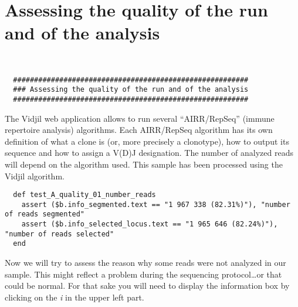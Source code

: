 
\section{Assessing the quality of the run and of the analysis}
\begin{verbatim}


  ########################################################
  ### Assessing the quality of the run and of the analysis
  ########################################################

\end{verbatim}

The Vidjil web application allows to run several ``AIRR/RepSeq'' (immune repertoire analysis) algorithms.
Each AIRR/RepSeq algorithm has its own definition of what a clone is (or, more precisely
a clonotype), how to output its sequence and how to assign a V(D)J designation.
The number of analyzed reads will depend on the algorithm used.
This sample has been processed using the Vidjil algorithm.


\begin{verbatim}
  def test_A_quality_01_number_reads
    assert ($b.info_segmented.text == "1 967 338 (82.31%)"), "number of reads segmented"
    assert ($b.info_selected_locus.text == "1 965 646 (82.24%)"), "number of reads selected"
  end
\end{verbatim}

Now we will try to assess the reason why some reads were not analyzed in our
sample.
This might reflect a problem during the sequencing protocol\dots or that could
be normal.
For that sake you will need to display the information box by clicking on the
\textit{i} in the upper left part.


